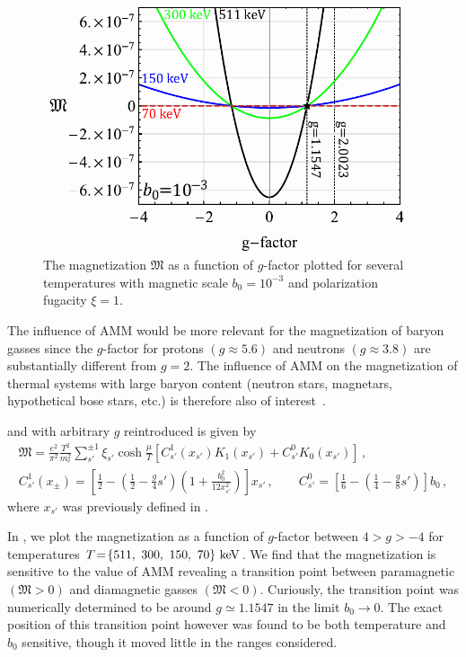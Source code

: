 \begin{figure}[ht]
 \centering
 \includegraphics[width=0.95\textwidth]{plots/chap04cosmo/thesis_gfac.pdf}
 \caption{The magnetization $\mathfrak M$ as a function of $g$-factor plotted for several temperatures with magnetic scale $b_{0}=10^{-3}$ and polarization fugacity $\xi=1$.}
 \label{fig:gfac} 
\end{figure}

The influence of AMM would be more relevant for the magnetization of baryon gasses since the $g$-factor for protons $(g\approx5.6)$ and neutrons $(g\approx3.8)$ are substantially different from $g\!=\!2$. The influence of AMM on the magnetization of thermal systems with large baryon content (neutron stars, magnetars, hypothetical bose stars, etc.) is therefore also of interest~\citep{Ferrer:2019xlr,Ferrer:2023pgq}.

 and  with arbitrary $g$ reintroduced is given by
\begin{gather}
\label{arbg:1}
{\mathfrak M}=\frac{e^{2}}{\pi^{2}}\frac{T^{2}}{m_{e}^{2}}\sum_{s'}^{\pm1}\xi_{s'}\cosh{\frac{\mu}{T}}
\left[C^{1}_{s'}(x_{s'})K_{1}(x_{s'})+C^{0}_{s'}K_{0}(x_{s'})\right]\,,\\
\label{arbg:2}
C^{1}_{s'}(x_{\pm}) = \left[\frac{1}{2}-\left(\frac{1}{2}-\frac{g}{4}s'\right)\left(1+\frac{b^2_0}{12x^{2}_{s'}}\right)\right]x_{s'}\,,\qquad
C^{0}_{s'} = \left[\frac{1}{6}-\left(\frac{1}{4}-\frac{g}{8}s'\right)\right]b_0\,,
\end{gather}
where $x_{s'}$ was previously defined in .

In , we plot the magnetization as a function of $g$-factor between $4>g>-4$ for temperatures $T\!=\!\{511,\ 300,\ 150,\ 70\}\keV$. We find that the magnetization is sensitive to the value of AMM revealing a transition point between paramagnetic $({\mathfrak M}>0)$ and diamagnetic gasses $({\mathfrak M}<0)$. Curiously, the transition point was numerically determined to be around $g\simeq1.1547$ in the limit $b_{0}\rightarrow0$. The exact position of this transition point however was found to be both temperature and $b_{0}$ sensitive, though it moved little in the ranges considered.

